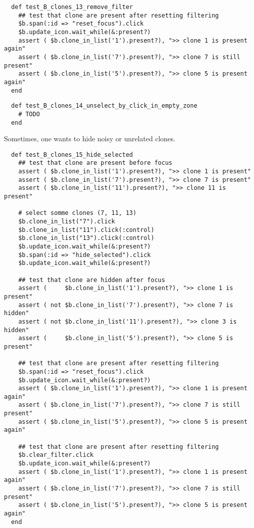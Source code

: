 \begin{verbatim}
  def test_B_clones_13_remove_filter
    ## test that clone are present after resetting filtering
    $b.span(:id => "reset_focus").click
    $b.update_icon.wait_while(&:present?)
    assert ( $b.clone_in_list('1').present?), ">> clone 1 is present again"
    assert ( $b.clone_in_list('7').present?), ">> clone 7 is still present"
    assert ( $b.clone_in_list('5').present?), ">> clone 5 is present again"
  end
\end{verbatim}

\begin{verbatim}
  def test_B_clones_14_unselect_by_click_in_empty_zone
    # TODO
  end
\end{verbatim}

Sometimes, one wants to hide noisy or unrelated clones.

\begin{verbatim}
  def test_B_clones_15_hide_selected
    ## test that clone are present before focus
    assert ( $b.clone_in_list('1').present?), ">> clone 1 is present"
    assert ( $b.clone_in_list('7').present?), ">> clone 7 is present"
    assert ( $b.clone_in_list('11').present?), ">> clone 11 is present"
    
    # select somme clones (7, 11, 13)
    $b.clone_in_list("7").click
    $b.clone_in_list("11").click(:control)
    $b.clone_in_list("13").click(:control)
    $b.update_icon.wait_while(&:present?)
    $b.span(:id => "hide_selected").click
    $b.update_icon.wait_while(&:present?)

    ## test that clone are hidden after focus
    assert (     $b.clone_in_list('1').present?), ">> clone 1 is present"
    assert ( not $b.clone_in_list('7').present?), ">> clone 7 is hidden"
    assert ( not $b.clone_in_list('11').present?), ">> clone 3 is hidden"
    assert (     $b.clone_in_list('5').present?), ">> clone 5 is present"

    ## test that clone are present after resetting filtering
    $b.span(:id => "reset_focus").click
    $b.update_icon.wait_while(&:present?)
    assert ( $b.clone_in_list('1').present?), ">> clone 1 is present again"
    assert ( $b.clone_in_list('7').present?), ">> clone 7 is still present"
    assert ( $b.clone_in_list('5').present?), ">> clone 5 is present again"

    ## test that clone are present after resetting filtering
    $b.clear_filter.click
    $b.update_icon.wait_while(&:present?)
    assert ( $b.clone_in_list('1').present?), ">> clone 1 is present again"
    assert ( $b.clone_in_list('7').present?), ">> clone 7 is still present"
    assert ( $b.clone_in_list('5').present?), ">> clone 5 is present again"
  end
\end{verbatim}

